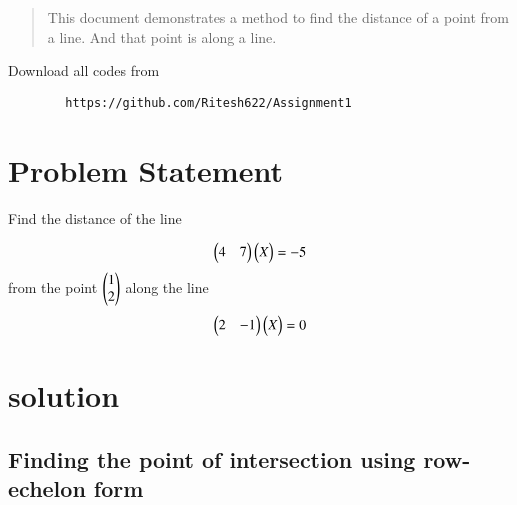 \documentclass[journal,12pt,twocolumn]{IEEEtran}
\begin{document}
\maketitle
\newpage
\bigskip
\renewcommand{\thefigure}{\theenumi}
\renewcommand{\thetable}{\theenumi}
%		
%		
		\date{Today}
		
	\begin{abstract}
		This document demonstrates a method to find the distance of a point from a line. And that point is along a line.
		\end{abstract}	
		Download all  codes from 
		
		\begin{lstlisting}
		https://github.com/Ritesh622/Assignment1
		\end{lstlisting}	
	\section{Problem Statement} 	




	Find the distance of the line 
	
	
	\begin{align}
\begin{pmatrix}4 & 7\end{pmatrix}\begin{pmatrix}X\end{pmatrix} = - 5 
\end{align}
from the point
$ \begin{pmatrix}				
1 \\
2 \\			
\end{pmatrix} $  along the line 
	\begin{align}
	\begin{pmatrix}2 & -1\end{pmatrix}\begin{pmatrix}X\end{pmatrix} = 0
	\end{align}
\section{solution}

\subsection {Finding the point of intersection using  row-echelon form}	
\end{document}
